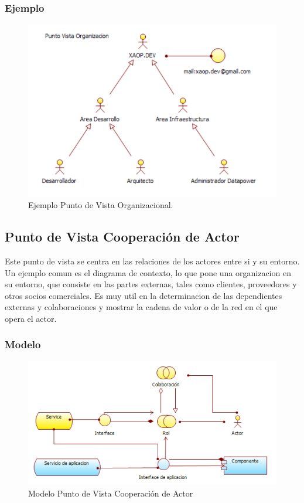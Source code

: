 \subsubsection{Ejemplo}
    \begin{figure}[th!]
        \centering
        \includegraphics[width=1.0\textwidth]{Arquitectura/images/Punto_de_Vista_de_Organizacion.pdf}
        \caption{Ejemplo Punto de Vista Organizacional.}
    \end{figure}
\newpage

\subsection{Punto de Vista Cooperación de Actor}
Este punto de vista se centra en las relaciones de los actores entre si y su entorno. Un ejemplo comun es el diagrama de contexto, lo que pone una organizacion en su entorno, que consiste en las partes externas, tales como clientes, proveedores y otros socios comerciales. Es muy util en la determinacion de las dependientes externas y colaboraciones y mostrar la cadena de valor o de la red en el que opera el actor.
\subsubsection{Modelo}
    \begin{figure}[th!]
        \centering
        \includegraphics[width=1.0\textwidth]{Arquitectura/images/modelo/Punto_de_Vista_de_Cooperacion.pdf}
        \caption{Modelo Punto de Vista Cooperación de Actor}
    \end{figure}
\newpage
